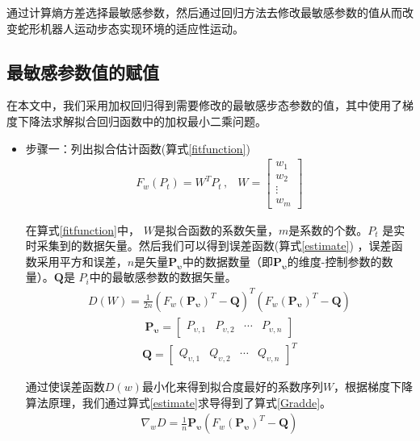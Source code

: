 通过计算熵方差选择最敏感参数，然后通过回归方法去修改最敏感参数的值从而改变蛇形机器人运动步态实现环境的适应性运动。

\subsection{最敏感参数值的赋值}
在本文中，我们采用加权回归得到需要修改的最敏感步态参数的值，其中使用了梯度下降法求解拟合回归函数中的加权最小二乘问题。

\begin{itemize}
	\item 步骤一：列出拟合估计函数(算式\ref{fitfunction})
	\begin{eqnarray}\label{fitfunction}
	F_{w}(P_{t})=W^{T}P_{t}\,,&W=\begin{bmatrix}w_{1}\\ w_{2}\\ \vdots \\ w_{m}\end{bmatrix}
	\end{eqnarray}
	
	在算式\ref{fitfunction}中， $W$是拟合函数的系数矢量，$m$是系数的个数。$P_{t}$ 是实时采集到的数据矢量。然后我们可以得到误差函数(算式\ref{estimate}) ，误差函数采用平方和误差，$n$是矢量$\bm{P_{\upsilon}}$中的数据数量（即$\bm{P_{\upsilon}}$的维度-控制参数的数量）。$\bm{Q}$是 $P_{i}$中的最敏感参数的数据矢量。
	\begin{eqnarray}\label{estimate}
	D(W)=\frac{1}{2n}(F_{w}(\bm{P_{\upsilon}})^{T}-\bm{Q})^{T}(F_{w}(\bm{P_{\upsilon}})^{T}-\bm{Q})
	\end{eqnarray}
	\begin{eqnarray}
	\bm{P_{\upsilon}}=\begin{bmatrix}P_{\upsilon,1}&P_{\upsilon,2}  &\cdots  &P_{\upsilon,n} \end{bmatrix}
	\end{eqnarray}
	\begin{eqnarray}
	\bm{Q}=\begin{bmatrix}Q_{\upsilon,1}& Q_{\upsilon,2}& \cdots & Q_{\upsilon,n}\end{bmatrix}^{T}
	\end{eqnarray}
	
	通过使误差函数$D(w)$最小化来得到拟合度最好的系数序列$W$，根据梯度下降算法原理，我们通过算式\ref{estimate}求导得到了算式\ref{Gradde}。
	\begin{eqnarray}\label{Gradde}
	\nabla_{w}D=\frac{1}{n}\bm{P_{\upsilon}}(F_{w}(\bm{P_{\upsilon}})^{T}-\bm{Q})
	\end{eqnarray}
	

\end{itemize}
